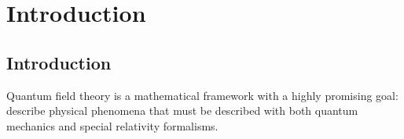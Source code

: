 \part{Introduction}

\chapter{Introduction}

    Quantum field theory is a mathematical framework with a highly promising goal: describe physical phenomena that must be described with both quantum mechanics and special relativity formalisms. 
